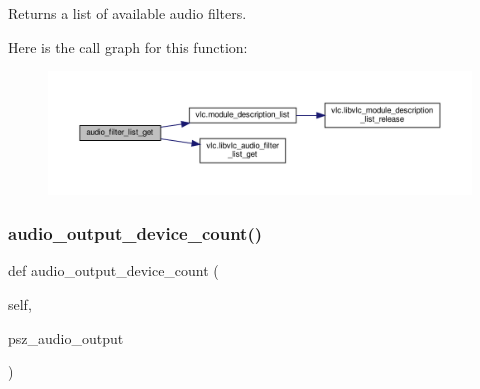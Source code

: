 \begin{DoxyVerb}Returns a list of available audio filters.\end{DoxyVerb}
 Here is the call graph for this function\+:
\nopagebreak
\begin{figure}[H]
\begin{center}
\leavevmode
\includegraphics[width=350pt]{classvlc_1_1_instance_a267774a685e64a5f8f666a4b6f8ac85f_cgraph}
\end{center}
\end{figure}
\mbox{\label{classvlc_1_1_instance_a57716b6319f79d3eaec358210e598d6d}} 
\subsubsection{\texorpdfstring{audio\+\_\+output\+\_\+device\+\_\+count()}{audio\_output\_device\_count()}}
{\footnotesize\ttfamily def audio\+\_\+output\+\_\+device\+\_\+count (\begin{DoxyParamCaption}\item[{}]{self,  }\item[{}]{psz\+\_\+audio\+\_\+output }\end{DoxyParamCaption})}

